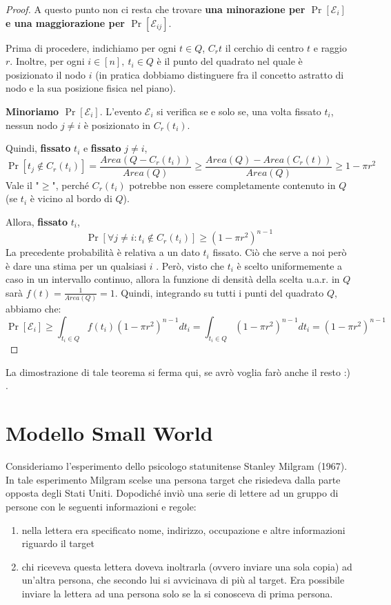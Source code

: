 \begin{proof}
 A questo punto non ci resta che trovare \textbf{una minorazione per $\Pr[\mathcal{E}_i]$ e una maggiorazione per $\Pr[\mathcal{E}_{ij}]$}.

Prima di procedere, indichiamo per ogni $t \in Q$, $C_r{t}$ il cerchio di centro $t$ e raggio $r$. Inoltre, per ogni $i \in [n],\ t_i \in Q$ è il punto del quadrato nel quale è posizionato il nodo $i$ (in pratica dobbiamo distinguere fra il concetto astratto di nodo e la sua posizione fisica nel piano). 

\textbf{Minoriamo $\Pr[\mathcal{E}_i]$}. L'evento $\mathcal{E}_i$ si verifica se e solo se, una volta fissato $t_i$, nessun nodo $j \neq i$ è posizionato in $C_r(t_i)$.

Quindi, \textbf{fissato} $t_i$ e \textbf{fissato} $j \neq i$,
\[
\Pr[t_j \notin C_r(t_i)] = \frac{Area(Q - C_r(t_i))}{Area(Q)} \geq \frac{Area(Q) - Area(C_r(t))}{Area(Q)} \geq 1 - \pi r^2
\]
Vale il "$\geq$", perché $C_r(t_i)$ potrebbe non essere completamente contenuto in $Q$ (se $t_i$ è vicino al bordo di $Q$).

Allora, \textbf{fissato} $t_i$, 
\[
\Pr[\forall j \neq i: t_i \notin C_r(t_i)] \geq (1 - \pi r^2)^{n - 1}
\]
La precedente probabilità è relativa a un dato $t_i$ fissato. Ciò che serve a noi però è dare una stima per un qualsiasi $i$ . Però, visto che $t_i$ è scelto uniformemente a caso in un intervallo continuo, allora la funzione di densità della scelta u.a.r. in $Q$ sarà $f(t) = \frac{1}{Area(Q)} = 1$. Quindi, integrando su tutti i punti del quadrato $Q$, abbiamo che:
\[
\Pr[\mathcal{E}_i] \geq \int_{t_i \in Q} f(t_i)(1 - \pi r^2)^{n - 1} dt_i = \int_{t_i \in Q} (1 - \pi r^2)^{n - 1} dt_i = (1 - \pi r^2)^{n - 1}
\]
\end{proof}

La dimostrazione di tale teorema si ferma qui, se avrò voglia farò anche il resto :) .

\newpage

\section{Modello Small World}

Consideriamo l'esperimento dello psicologo statunitense Stanley Milgram (1967). In tale esperimento Milgram scelse una persona target che risiedeva dalla parte opposta degli Stati Uniti. Dopodiché inviò una serie di lettere ad un gruppo di persone con le seguenti informazioni e regole:
\begin{enumerate}
    \item nella lettera era specificato nome, indirizzo, occupazione e altre informazioni riguardo il target
    \item chi riceveva questa lettera doveva inoltrarla (ovvero inviare una sola copia) ad un'altra persona, che secondo lui si avvicinava di più al target. Era possibile inviare la lettera ad una persona solo se la si conosceva di prima persona.
\end{enumerate}
    
